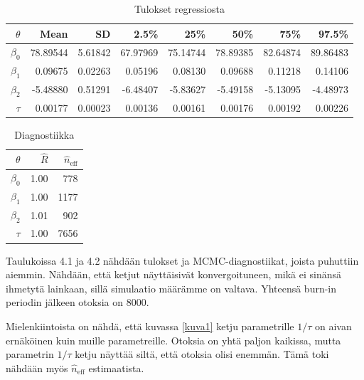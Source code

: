 \begin{table}[ht]
\centering
\label{results}
\begin{tabular}{rrrrrrrr}
  \hline
 $\theta$ & Mean & SD & 2.5\% & 25\% & 50\% & 75\% & 97.5\% \\ 
  \hline
  $\beta_0$ & 78.89544 & 5.61842 & 67.97969 & 75.14744 & 78.89385 & 82.64874 & 89.86483 \\ 
  $\beta_1$ & 0.09675 & 0.02263 & 0.05196 & 0.08130 & 0.09688 & 0.11218 & 0.14106 \\ 
  $\beta_2$ & -5.48880 & 0.51291 & -6.48407 & -5.83627 & -5.49158 & -5.13095 & -4.48973 \\ 
  $\tau$ & 0.00177 & 0.00023 & 0.00136 & 0.00161 & 0.00176 & 0.00192 & 0.00226 \\ 
   \hline
\end{tabular}
\caption{Tulokset regressiosta}
\end{table}
\begin{table}[ht]\label{diagnostics}
\centering
\begin{tabular}{rrr}
  \hline
 $\theta$ & $\hat{R}$ & $\hat{n}_{\mathrm{eff}}$ \\ 
  \hline
  $\beta_0$ & 1.00 & 778 \\ 
  $\beta_1$ & 1.00 & 1177 \\ 
  $\beta_2$ & 1.01 & 902  \\ 
  $\tau$ & 1.00 & 7656  \\ 
   \hline
\end{tabular}
\caption{Diagnostiikka}
\end{table}

Taulukoissa 4.1 ja 4.2 nähdään tulokset ja MCMC-diagnostiikat, joista puhuttiin aiemmin. Nähdään, että ketjut näyttäisivät konvergoituneen, mikä ei sinänsä ihmetytä lainkaan, sillä simulaatio määrämme on valtava. Yhteensä burn-in periodin jälkeen otoksia on 8000. 

Mielenkiintoista on nähdä, että kuvassa \ref{kuva1} ketju parametrille $1/\tau$ on aivan ernäköinen kuin muille parametreille. Otoksia on yhtä paljon kaikissa, mutta parametrin $1/\tau$ ketju näyttää siltä, että otoksia olisi enemmän. Tämä toki nähdään myös $\hat{n}_{\mathrm{eff}}$ estimaatista.

